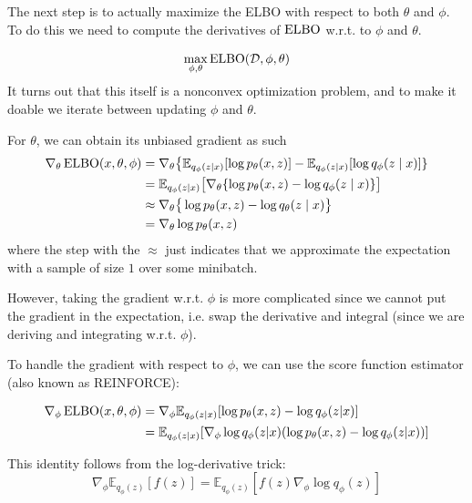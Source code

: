   The next step is to actually maximize the ELBO with respect to both $\theta$ and $\phi$. To do this we need to compute the derivatives of $\elbo$ w.r.t. to $\phi$ and $\theta$. 

  \begin{equation}
    \max_{\phi, \theta} \elbo(\mathcal{D}, \phi, \theta)
  \end{equation}
  It turns out that this itself is a nonconvex optimization problem, and to make it doable we iterate between updating $\phi$ and $\theta$. 

  \begin{lemma}
    For $\theta$, we can obtain its unbiased gradient as such
    \begin{align} 
      \nabla_\theta \elbo(x, \theta, \phi) & = \nabla_\theta \big\{ \mathbb{E}_{q_\phi (z \mid x)} [ \log p_\theta (x, z)] - \mathbb{E}_{q_\phi (z \mid x)} [\log q_{\phi} (z \mid x)] \} \\
                                           & = \mathbb{E}_{q_\phi (z \mid x)} \big[ \nabla_\theta \{ \log p_\theta (x, z) - \log q_{\phi} (z \mid x) \}  \big] \\
                                           & \approx \nabla_\theta \big\{ \log p_\theta(x, z) - \log q_\theta (z \mid x) \big\} \\
                                           & = \nabla_\theta \log p_\theta (x, z) 
    \end{align}
    where the step with the $\approx$ just indicates that we approximate the expectation with a sample of size $1$ over some minibatch. 
  \end{lemma}

  However, taking the gradient w.r.t. $\phi$ is more complicated since we cannot put the gradient in the expectation, i.e. swap the derivative and integral (since we are deriving and integrating w.r.t. $\phi$). 

  \begin{lemma}
    To handle the gradient with respect to $\phi$, we can use the score function estimator (also known as REINFORCE):

    \begin{align}
      \nabla_\phi \elbo(x, \theta, \phi) &= \nabla_\phi \mathbb{E}_{q_\phi(z|x)}[\log p_\theta(x,z) - \log q_\phi(z|x)] \\
      &= \mathbb{E}_{q_\phi(z|x)}[\nabla_\phi \log q_\phi(z|x)(\log p_\theta(x,z) - \log q_\phi(z|x))]
    \end{align}

    This identity follows from the log-derivative trick:
    \begin{equation}
      \nabla_\phi \mathbb{E}_{q_\phi(z)}[f(z)] = \mathbb{E}_{q_\phi(z)}[f(z)\nabla_\phi \log q_\phi(z)]
    \end{equation}
  \end{lemma}

